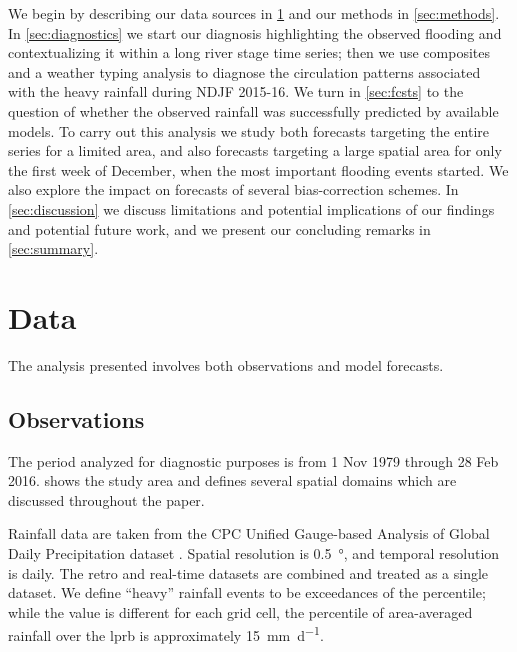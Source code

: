 \documentclass[twocol]{ametsoc}
\begin{document}
We begin by describing our data sources in \cref{sec:data} and our methods in \cref{sec:methods}.
In \cref{sec:diagnostics} we start our diagnosis highlighting the observed flooding and contextualizing it within a long river stage time series; then we use composites and a weather typing analysis to diagnose the circulation patterns associated with the heavy rainfall during NDJF 2015-16. We turn in \cref{sec:fcsts} to the question of whether the observed rainfall was successfully predicted by available models.
To carry out this analysis we study both forecasts targeting the entire series for a limited area, and also forecasts targeting a large spatial area for only the first week of December, when the most important flooding events started.
We also explore the impact on forecasts of several bias-correction schemes.
In \cref{sec:discussion} we discuss limitations and potential implications of our findings and potential future work, and we present our concluding remarks in \cref{sec:summary}.


\section{Data} \label{sec:data}

The analysis presented involves both observations and model forecasts.

\subsection{Observations}

The period analyzed for diagnostic purposes is from 1 Nov 1979 through 28 Feb 2016.
 shows the study area and defines several spatial domains which are discussed throughout the paper.

Rainfall data are taken from the CPC Unified Gauge-based Analysis of Global Daily Precipitation dataset \citep{Xie2010}.
Spatial resolution is \SI{0.5}{\degree}, and temporal resolution is daily.
The retro and real-time datasets are combined and treated as a single dataset.
We define ``heavy'' rainfall events to be exceedances of the  percentile; while the value is different for each grid cell, the  percentile of area-averaged rainfall over the \gls{lprb} is approximately \SI{15}{\milli\meter\per\day}.
\end{document}
